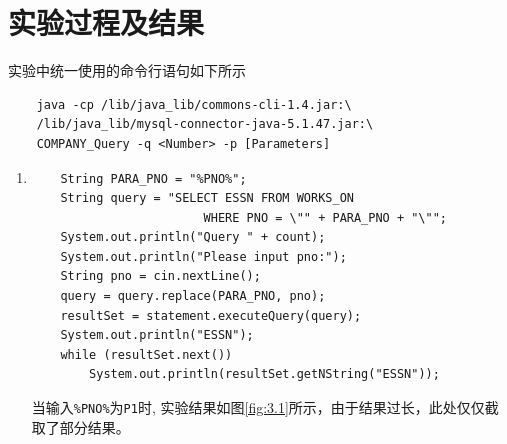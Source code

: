 \documentclass{ML}
\begin{document}
\section{实验过程及结果}
实验中统一使用的命令行语句如下所示
\begin{verbatim}
    java -cp /lib/java_lib/commons-cli-1.4.jar:\
    /lib/java_lib/mysql-connector-java-5.1.47.jar:\ 
    COMPANY_Query -q <Number> -p [Parameters]
\end{verbatim}
\begin{enumerate}
    \item \begin{verbatim}
    String PARA_PNO = "%PNO%";
    String query = "SELECT ESSN FROM WORKS_ON 
                        WHERE PNO = \"" + PARA_PNO + "\"";
    System.out.println("Query " + count);
    System.out.println("Please input pno:");
    String pno = cin.nextLine();
    query = query.replace(PARA_PNO, pno);
    resultSet = statement.executeQuery(query);
    System.out.println("ESSN");
    while (resultSet.next())
        System.out.println(resultSet.getNString("ESSN"));
    \end{verbatim}
    当输入\texttt{\%PNO\%}为\texttt{P1}时, 实验结果如图\ref{fig:3.1}所示，由于结果过长，此处仅仅截取了部分结果。
    \begin{figure}[H]
        \centering

\end{figure}
\end{enumerate}
\end{document}
